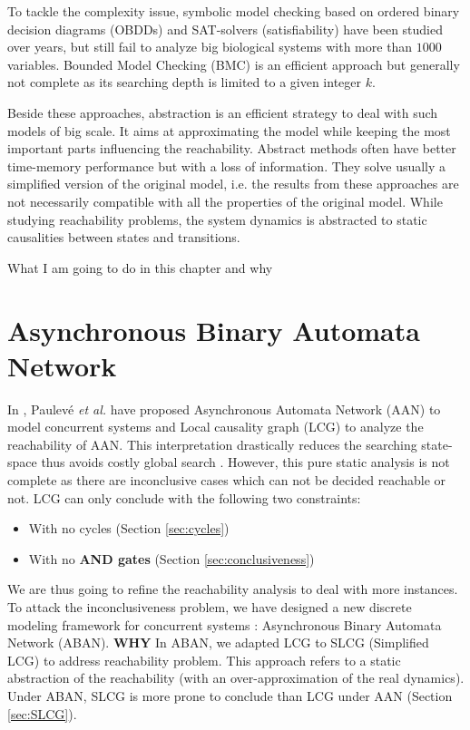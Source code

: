 To tackle the complexity issue, symbolic model checking \cite{burch1992symbolic} based on ordered binary decision diagrams (OBDDs) and SAT-solvers (satisfiability) \cite{abdulla2000symbolic} have been studied over years, but still fail to analyze big biological systems with more than $1000$ variables. 
Bounded Model Checking (BMC) \cite{clarke2001bounded} is an efficient approach but generally not complete as its searching depth is limited to a given integer $k$.

Beside these approaches, abstraction is an efficient strategy to deal with such models of big scale. 
It aims at approximating the model while keeping the most important parts influencing the reachability.
Abstract methods often have better time-memory performance but with a loss of information. 
They solve usually a simplified version of the original model, i.e. the results from these approaches are not necessarily compatible with all the properties of the original model.
While studying reachability problems, the system dynamics is abstracted to static causalities between states and transitions.


What I am going to do in this chapter and why
\section{Asynchronous Binary Automata Network}
In \cite{folschette2015}, Paulev\'e \textit{et al.} have proposed Asynchronous Automata Network (AAN) to model concurrent systems and Local causality graph (LCG) \cite{pauleve2017reduction,folschette2015,pauleve2011} to analyze the reachability of AAN.
This interpretation drastically reduces the searching state-space thus avoids costly global search \cite{pauleve2012}. 
However, this pure static analysis is not complete as there are inconclusive cases which can not be decided reachable or not.
LCG can only conclude with the following two constraints:
\begin{itemize}
    \item With no cycles (Section \ref{sec:cycles})
    \item With no \textbf{AND gates} (Section \ref{sec:conclusiveness})
\end{itemize}
We are thus going to refine the reachability analysis to deal with more instances.
To attack the inconclusiveness problem, we have designed a new discrete modeling framework for concurrent systems \cite{chai2018heuristic}: Asynchronous Binary Automata Network (ABAN).
\textbf{WHY} In ABAN, we adapted LCG to SLCG (Simplified LCG) to address reachability problem.
This approach refers to a static abstraction of the reachability (with an over-approximation of the real dynamics).
Under ABAN, SLCG is more prone to conclude than LCG under AAN (Section \ref{sec:SLCG}).

